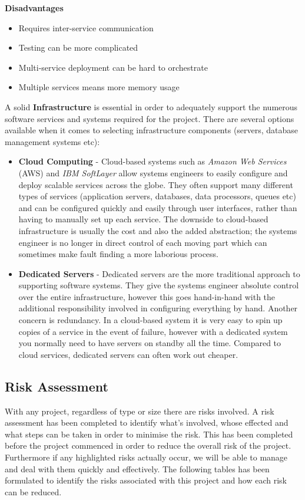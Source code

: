     \textbf{Disadvantages}
    \begin{itemize}
      \item Requires inter-service communication
      \item Testing can be more complicated
      \item Multi-service deployment can be hard to orchestrate
      \item Multiple services means more memory usage
    \end{itemize}
A solid \textbf{Infrastructure} is essential in order to adequately support the numerous software services and systems required for the project. There are several options available when it comes to selecting infrastructure components (servers, database management systems etc):
    \begin{itemize}
      \item \textbf{Cloud Computing} -
        Cloud-based systems such as \emph{Amazon Web Services} (AWS) and \emph{IBM SoftLayer} allow systems engineers to easily configure and deploy scalable services across the globe. They often support many different types of services (application servers, databases, data processors, queues etc) and can be configured quickly and easily through user interfaces, rather than having to manually set up each service. The downside to cloud-based infrastructure is usually the cost and also the added abstraction; the systems engineer is no longer in direct control of each moving part which can sometimes make fault finding a more laborious process.
      \item \textbf{Dedicated Servers} -
        Dedicated servers are the more traditional approach to supporting software systems. They give the systems engineer absolute control over the entire infrastructure, however this goes hand-in-hand with the additional responsibility involved in configuring everything by hand. Another concern is redundancy. In a cloud-based system it is very easy to spin up copies of a service in the event of failure, however with a dedicated system you normally need to have servers on standby all the time. Compared to cloud services, dedicated servers can often work out cheaper.
    \end{itemize}

\subsection{Risk Assessment}
With any project, regardless of type or size there are risks involved. A risk assessment has been completed to identify what's involved, whose effected and what steps can be taken in order to minimise the risk.  This has been completed before the project commenced in order to reduce the overall risk of the project.  Furthermore if any highlighted risks actually occur, we will be able to manage and deal with them quickly and effectively.  The following tables has been formulated to identify the risks associated with this project and how each risk can be reduced.\\

